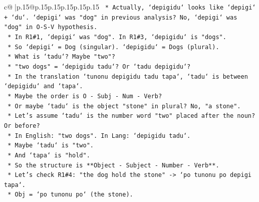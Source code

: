 \documentclass{article}
\begin{document}
{\begin{supertabular}{c@{$\;$}|p{.15\linewidth}@{}p{.15\linewidth}p{.15\linewidth}p{.15\linewidth}p{.15\linewidth}p{.15\linewidth}}
{{{\texttt{                                                                    *   Actually, `depigidu` looks like `depigi` + `du`. `depigi` was "dog" in previous analysis? No, `depigi` was "dog" in O{-}S{-}V hypothesis.} \\
\texttt{                                                                    *   In R1\#1, `depigi` was "dog". In R1\#3, `depigidu` is "dogs".} \\
\texttt{                                                                    *   So `depigi` = Dog (singular). `depigidu` = Dogs (plural).} \\
\texttt{                                                                    *   What is `tadu`? Maybe "two"?} \\
\texttt{                                                                    *   "two dogs" = `depigidu tadu`? Or `tadu depigidu`?} \\
\texttt{                                                                    *   In the translation `tunonu depigidu tadu tapa`, `tadu` is between `depigidu` and `tapa`.} \\
\texttt{                                                                    *   Maybe the order is O {-} Subj {-} Num {-} Verb?} \\
\texttt{                                                                    *   Or maybe `tadu` is the object "stone" in plural? No, "a stone".} \\
\texttt{                                                                    *   Let's assume `tadu` is the number word "two" placed after the noun? Or before?} \\
\texttt{                                                                    *   In English: "two dogs". In Lang: `depigidu tadu`.} \\
\texttt{                                                                    *   Maybe `tadu` is "two".} \\
\texttt{                                                                    *   And `tapa` is "hold".} \\
\texttt{                                                                    *   So the structure is **Object {-} Subject {-} Number {-} Verb**.} \\
\texttt{                                                                    *   Let's check R1\#4: "the dog hold the stone" {-}> `po tunonu po depigi tapa`.} \\
\texttt{                                                                        *   Obj = `po tunonu po` (the stone).} \\
}}}
\end{supertabular}}
\end{document}
